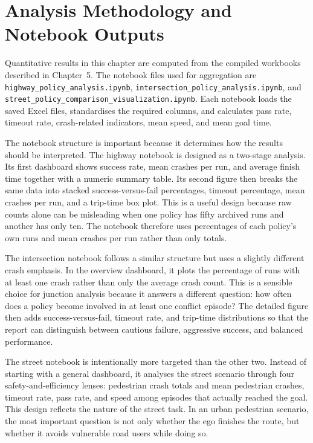 \documentclass[12pt,a4paper]{report}
\begin{document}
\section{Analysis Methodology and Notebook Outputs}
Quantitative results in this chapter are computed from the compiled workbooks described in Chapter~5. The notebook files used for aggregation are \texttt{highway\_policy\_analysis.ipynb}, \texttt{intersection\_policy\_analysis.ipynb}, and \texttt{street\_policy\_comparison\_visualization.ipynb}. Each notebook loads the saved Excel files, standardises the required columns, and calculates pass rate, timeout rate, crash-related indicators, mean speed, and mean goal time.

The notebook structure is important because it determines how the results should be interpreted. The highway notebook is designed as a two-stage analysis. Its first dashboard shows success rate, mean crashes per run, and average finish time together with a numeric summary table. Its second figure then breaks the same data into stacked success-versus-fail percentages, timeout percentage, mean crashes per run, and a trip-time box plot. This is a useful design because raw counts alone can be misleading when one policy has fifty archived runs and another has only ten. The notebook therefore uses percentages of each policy's own runs and mean crashes per run rather than only totals.

The intersection notebook follows a similar structure but uses a slightly different crash emphasis. In the overview dashboard, it plots the percentage of runs with at least one crash rather than only the average crash count. This is a sensible choice for junction analysis because it answers a different question: how often does a policy become involved in at least one conflict episode? The detailed figure then adds success-versus-fail, timeout rate, and trip-time distributions so that the report can distinguish between cautious failure, aggressive success, and balanced performance.

The street notebook is intentionally more targeted than the other two. Instead of starting with a general dashboard, it analyses the street scenario through four safety-and-efficiency lenses: pedestrian crash totals and mean pedestrian crashes, timeout rate, pass rate, and speed among episodes that actually reached the goal. This design reflects the nature of the street task. In an urban pedestrian scenario, the most important question is not only whether the ego finishes the route, but whether it avoids vulnerable road users while doing so.
\end{document}
